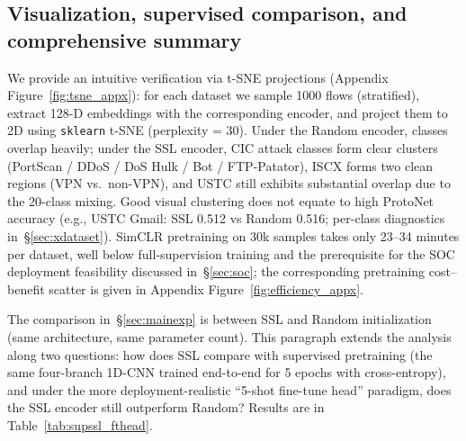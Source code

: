 \documentclass[sensors,article,submit,moreauthors]{Definitions/mdpi}
\begin{document}
\subsection{Visualization, supervised comparison, and comprehensive summary}
\label{sec:fthead}

We provide an intuitive verification via t-SNE projections (Appendix Figure~\ref{fig:tsne_appx}): for each dataset we sample 1000 flows (stratified), extract 128-D embeddings with the corresponding encoder, and project them to 2D using \texttt{sklearn} t-SNE (perplexity = 30). Under the Random encoder, classes overlap heavily; under the SSL encoder, CIC attack classes form clear clusters (PortScan / DDoS / DoS Hulk / Bot / FTP-Patator), ISCX forms two clean regions (VPN vs.\ non-VPN), and USTC still exhibits substantial overlap due to the 20-class mixing. Good visual clustering does not equate to high ProtoNet accuracy (e.g., USTC Gmail: SSL 0.512 vs Random 0.516; per-class diagnostics in~\S\ref{sec:xdataset}). SimCLR pretraining on 30k samples takes only 23--34 minutes per dataset, well below full-supervision training and the prerequisite for the SOC deployment feasibility discussed in~\S\ref{sec:soc}; the corresponding pretraining cost--benefit scatter is given in Appendix Figure~\ref{fig:efficiency_appx}.

The comparison in~\S\ref{sec:mainexp} is between SSL and Random initialization (same architecture, same parameter count). This paragraph extends the analysis along two questions: how does SSL compare with supervised pretraining (the same four-branch 1D-CNN trained end-to-end for 5 epochs with cross-entropy), and under the more deployment-realistic ``5-shot fine-tune head'' paradigm, does the SSL encoder still outperform Random? Results are in Table~\ref{tab:supssl_fthead}.
\end{document}
